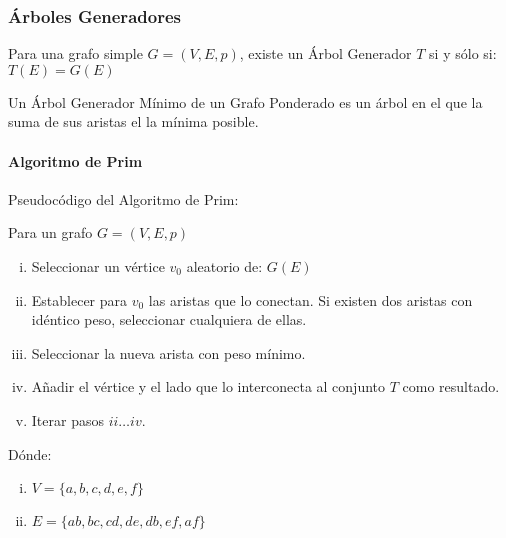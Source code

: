 \subsubsection{Árboles Generadores}

 Para una grafo simple $G = (V,E,p)$, existe un Árbol Generador $T$ si y 
sólo si: $T(E) = G(E)$

{\cor Un Árbol Generador Mínimo de un Grafo Ponderado es un árbol en el que la suma de sus aristas el la mínima posible.}

\paragraph{{Algoritmo de Prim}}

\prog Pseudocódigo del Algoritmo de Prim:



\algo Para un grafo $G = (V,E,p)$

\begin{enumerate}[i.]
\item Seleccionar un vértice $v_0$ aleatorio de: $G(E)$ 
 
\item Establecer para $v_0$ las aristas que lo conectan. Si existen dos aristas con idéntico peso, seleccionar cualquiera de ellas.

\item Seleccionar la nueva arista con peso mínimo.

\item Añadir el vértice y el lado que lo interconecta al conjunto $T$ como resultado.

\item Iterar pasos $ii \dots iv$.
\end{enumerate}



Dónde:

\begin{enumerate}[i.]

\item $V = \{a,b,c,d,e,f\}$ 

\item $E = \{ab,bc,cd,de,db,ef,af\}$ 

\end{enumerate}

